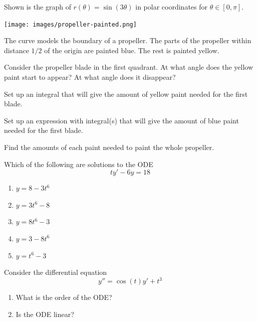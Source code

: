 \documentclass{workbook}
\begin{document}
\begin{slide}
	\question

		Shown is the graph of $\displaystyle
		r(\theta)=\sin(3\theta)
		$
		in polar coordinates
		for $\theta\in[0,\pi]$.
		\begin{center}
	\texttt{[image: images/propeller-painted.png]}
		\end{center}

	
	The curve models the boundary of a propeller. The parts of the propeller
	within distance $1/2$ of the origin are painted blue. The rest is painted yellow.

	\begin{parts}
		\item Consider the propeller blade in the first quadrant. At what
		angle does the yellow paint start to appear? At what angle does it 
		disappear?

		\item Set up an integral that will give the amount of yellow paint needed for the first blade.

		\item Set up an expression with integral(s) that will give the amount of blue paint needed
		for the first blade.

		\item Find the amounts of each paint needed to paint the 
		whole propeller.
	\end{parts}
\end{slide}

\begin{slide}
	\question

	\begin{parts}
		\item Which of the following are solutions to the ODE
		\[
			ty'-6y=18
		\]
		\begin{minipage}{\textwidth}
		\begin{enumerate}
			\item $y=8-3t^6$
			\item $y=3t^6-8$
			\item $y=8t^6-3$
			\item $y=3-8t^6$
			\item $y=t^6-3$
		\end{enumerate}
	\end{minipage}

		\item Consider the differential equation
		\[
			y''=\cos (t) y'+t^3
		\]
		\begin{enumerate}
			\item What is the order of the ODE?
			\item Is the ODE linear?
		\end{enumerate}
	\end{parts}
\end{slide}
\end{document}
